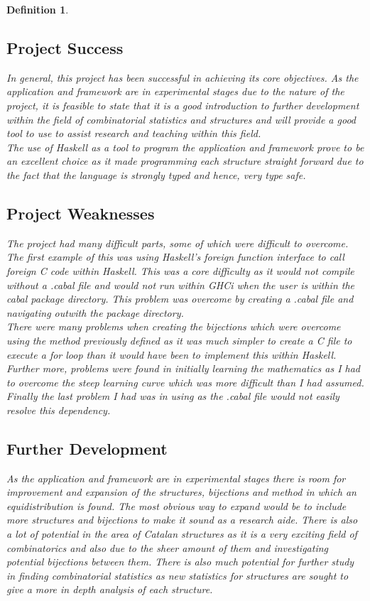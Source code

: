 \documentclass[12pt]{article}
\newtheorem{definition}{Definition}
\begin{document}
\begin{definition}
\subsection{Project Success}
In general, this project has been successful in achieving its core objectives. As the application and framework are in experimental stages due to the nature of the project, it is feasible to state that it is a good introduction to further development within the field of combinatorial statistics and structures and will provide a good tool to use to assist research and teaching within this field.\\
The use of Haskell as a tool to program the application and framework prove to be an excellent choice as it made programming each structure straight forward due to the fact that the language is strongly typed and hence, very type safe.\\

\subsection{Project Weaknesses}
The project had many difficult parts, some of which were difficult to overcome. The first example of this was using Haskell's foreign function interface to call foreign C code within Haskell. This was a core difficulty as it would not compile without a {\it .cabal} file and would not run within GHCi when the user is within the cabal package directory. This problem was overcome by creating a {\it .cabal} file and navigating outwith the package directory.\\
There were many problems when creating the bijections which were overcome using the method previously defined as it was much simpler to create a C file to execute a for loop than it would have been to implement this within Haskell.\\
Further more, problems were found in initially learning the mathematics as I had to overcome the steep learning curve which was more difficult than I had assumed.\\
Finally the last problem I had was in using \cite{Gloss} as the .cabal file would not easily resolve this dependency.

\subsection{Further Development}
As the application and framework are in experimental stages there is room for improvement and expansion of the structures, bijections and method in which an equidistribution is found. The most obvious way to expand would be to include more structures and bijections to make it sound as a research aide. There is also a lot of potential in the area of Catalan structures as it is a very exciting field of combinatorics and also due to the sheer amount of them and investigating potential bijections between them. There is also much potential for further study in finding combinatorial statistics as new statistics for structures are sought to give a more in depth analysis of each structure.


\end{definition}
\end{document}
